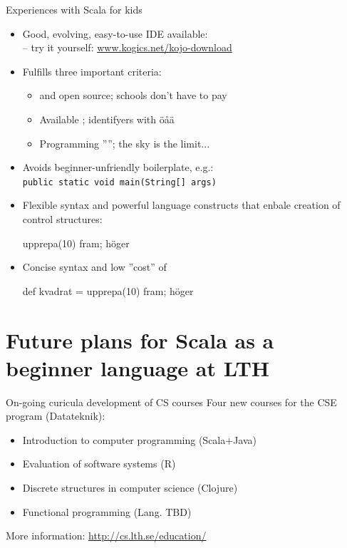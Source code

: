 \documentclass{lecturenotes}
\begin{document}
\begin{Slide}{Experiences with Scala for kids}
\begin{itemize}
\item Good, evolving, easy-to-use IDE available: \\  -- try it yourself: 
\href{http://www.kogics.net/kojo}{www.kogics.net/kojo-download}
\item Fulfills three important criteria: 
\begin{itemize}
\item {} and open source; schools don't have to pay
\item Available ; identifyers with öåä
\item Programming ''''; the sky is the limit...
\end{itemize}
\item Avoids beginner-unfriendly boilerplate, e.g.: \\ \texttt{public static void main(String[] args)}
\item Flexible syntax and powerful language constructs that enbale creation of  control structures:
\begin{Code}
upprepa(10){ fram; höger }
\end{Code}
\item Concise syntax and low ''cost'' of 
\begin{Code}
def kvadrat = upprepa(10){ fram; höger }
\end{Code}
\end{itemize}
\end{Slide}


\section[Plans for Scala at LTH]{Future plans for Scala as a beginner language at LTH}

\begin{Slide}{On-going curicula development of CS courses}
Four new courses for the CSE program (Datateknik):
\begin{itemize}
\item Introduction to computer programming (Scala+Java)
\item Evaluation of software systems (R)
\item Discrete structures in computer science (Clojure)
\item Functional programming (Lang. TBD)
\end{itemize}
\vspace{1em} More information:
\url{http://cs.lth.se/education/}
\end{Slide}
\end{document}
